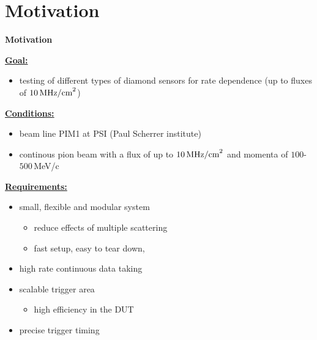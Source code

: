 \documentclass[9pt]{beamer}
\begin{document}
\section{Motivation}
\begin{frame}
	\begin{alertblock}{
		\begin{center}
			\Large{\textbf{Motivation}}
		\end{center}}
	\end{alertblock}
\end{frame}
\begin{frame}
	\underline{\textbf{Goal:}}
	\begin{itemize}
		\item testing of different types of diamond sensors for rate dependence (up to fluxes of $10\,\text{MHz/cm}^{2}$)
	\end{itemize}
	\underline{\textbf{Conditions:}}
	\begin{itemize}
		\item beam line PIM1 at PSI (Paul Scherrer institute)
		\item continous pion beam with a flux of up to $10\,\text{MHz/cm}^{2}$ and momenta of $100$-$500$\,MeV/c
	\end{itemize}
	\underline{\textbf{Requirements:}}
	\begin{itemize}
		\item small, flexible and modular system
		\begin{itemize}
			\item reduce effects of multiple scattering
			\item fast setup, easy to tear down, 
		\end{itemize}
		\item high rate continuous data taking
		\item scalable trigger area
		\begin{itemize}
			\item high efficiency in the DUT
		\end{itemize}
		\item precise trigger timing
	\end{itemize}
\end{frame}
\end{document}
